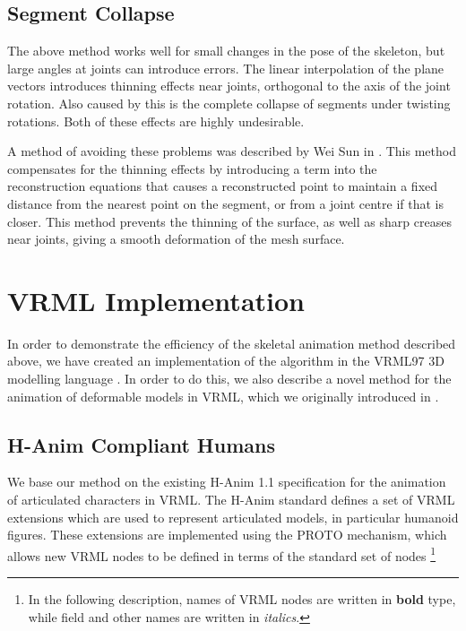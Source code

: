 \subsection{\label{sec:skeletalanim:anim:collapse}Segment Collapse}

The above method works well for small changes in the pose of the skeleton, but large angles at joints can introduce errors. The linear interpolation of the plane vectors introduces thinning effects near joints, orthogonal to the axis of the joint rotation. Also caused by this is the complete collapse of segments under twisting rotations. Both of these effects are highly undesirable.

A method of avoiding these problems was described by Wei Sun in \cite{Sun01}. This method compensates for the thinning effects by introducing a term into the reconstruction equations that causes a reconstructed point to maintain a fixed distance from the nearest point on the segment, or from a joint centre if that is closer. This method prevents the thinning of the surface, as well as sharp creases near joints, giving a smooth deformation of the mesh surface.

\section{\label{sec:skeletalanim:vrml}VRML Implementation}
In order to demonstrate the efficiency of the skeletal animation method described above, we have created an implementation of the algorithm in the VRML97 3D modelling language \cite{VRML97}. In order to do this, we also describe a novel method for the animation of deformable models in VRML, which we originally introduced in \cite{Smith00}.

\subsection{\label{sec:skeletalanim:vrml:hanim}H-Anim Compliant Humans}

We base our method on the existing H-Anim 1.1 specification \cite{HANIM99} for the animation of articulated characters in VRML. The H-Anim standard defines a set of VRML extensions which are used to represent articulated models, in particular humanoid figures. These extensions are implemented using the PROTO mechanism, which allows new VRML nodes to be defined in terms of the standard set of nodes \footnote{In the following description, names of VRML nodes are written in {\bf bold} type, while field and other names are written in {\it italics}.}

